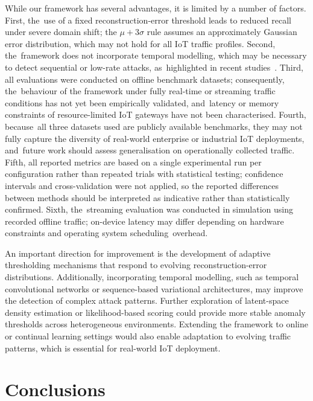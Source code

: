 \documentclass[futureinternet,article,accept,moreauthors]{Definitions/mdpi}
\begin{document}
While our framework has several advantages, it is limited by a number of factors. First, the~use of a fixed reconstruction-error threshold leads to reduced recall under severe domain shift; the $\mu + 3\sigma$ rule assumes an approximately Gaussian error distribution, which may not hold for all IoT traffic profiles. Second, the~framework does not incorporate temporal modelling, which may be necessary to detect sequential or low-rate attacks, as~highlighted in recent studies~\cite{owoh2024}. Third, all evaluations were conducted on offline benchmark datasets; consequently, the~behaviour of the framework under fully real-time or streaming traffic conditions has not yet been empirically validated, and~latency or memory constraints of resource-limited IoT gateways have not been characterised. Fourth, because~all three datasets used are publicly available benchmarks, they may not fully capture the diversity of real-world enterprise or industrial IoT deployments, and~future work should assess generalisation on operationally collected traffic. Fifth, all reported metrics are based on a single experimental run per configuration rather than repeated trials with statistical testing; confidence intervals and cross-validation were not applied, so the reported differences between methods should be interpreted as indicative rather than statistically confirmed. Sixth, the~streaming evaluation was conducted in simulation using recorded offline traffic; on-device latency may differ depending on hardware constraints and operating system scheduling~overhead.

An important direction for improvement is the development of adaptive thresholding mechanisms that respond to evolving reconstruction-error distributions. Additionally, incorporating temporal modelling, such as temporal convolutional networks or sequence-based variational architectures, may improve the detection of complex attack patterns. Further exploration of latent-space density estimation or likelihood-based scoring could provide more stable anomaly thresholds across heterogeneous environments. Extending the framework to online or continual learning settings would also enable adaptation to evolving traffic patterns, which is essential for real-world IoT deployment.%


\section{Conclusions} \label{sec7}
\end{document}
